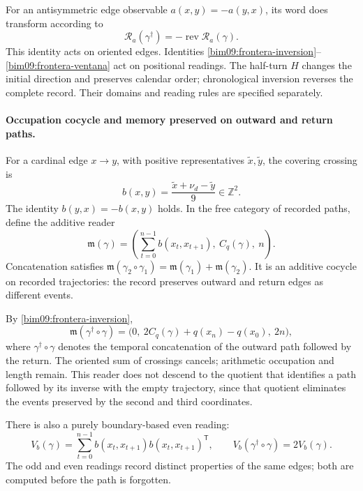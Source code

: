 For an antisymmetric edge observable $a(x,y)=-a(y,x)$, its word
does transform according to
\[
 \mathcal R_a(\gamma^\dagger)
 =-\operatorname{rev}\mathcal R_a(\gamma).
\]
This identity acts on oriented edges. Identities
\eqref{bim09:frontera-inversion}--\eqref{bim09:frontera-ventana}
act on positional readings. The half-turn $H$ changes the
initial direction and preserves calendar order; chronological
inversion reverses the complete record. Their domains and reading rules
are specified separately.

\paragraph{Occupation cocycle and memory preserved on outward and return paths.}

For a cardinal edge $x\to y$, with positive representatives
$\widetilde x,\widetilde y$, the covering crossing is
\[
 b(x,y)=\frac{\widetilde x+\nu_d-\widetilde y}{9}\in\mathbb Z^2.
\]
The identity $b(y,x)=-b(x,y)$ holds. In the free category of recorded
paths, define the additive reader
\begin{equation}
 \mathfrak m(\gamma)=
 \left(\sum_{t=0}^{n-1}b(x_t,x_{t+1}),\ C_q(\gamma),\ n\right).
 \label{bim09:memoria-aditiva}
\end{equation}
Concatenation satisfies
$\mathfrak m(\gamma_2\circ\gamma_1)=
\mathfrak m(\gamma_1)+\mathfrak m(\gamma_2)$.
It is an additive cocycle on recorded trajectories: the record preserves
outward and return edges as different events.

By \eqref{bim09:frontera-inversion},
\begin{equation}
 \mathfrak m(\gamma^\dagger\circ\gamma)=
 \bigl(0,\ 2C_q(\gamma)+q(x_n)-q(x_0),\ 2n\bigr),
 \label{bim09:memoria-retorno}
\end{equation}
where $\gamma^\dagger\circ\gamma$ denotes the temporal concatenation
of the outward path followed by the return. The oriented sum of crossings cancels;
arithmetic occupation and length remain. This reader does not
descend to the quotient that identifies a path followed by its inverse
with the empty trajectory, since that quotient eliminates the events
preserved by the second and third coordinates.

There is also a purely boundary-based even reading:
\[
 V_b(\gamma)=\sum_{t=0}^{n-1}
 b(x_t,x_{t+1})b(x_t,x_{t+1})^{\mathsf T},\qquad
 V_b(\gamma^\dagger\circ\gamma)=2V_b(\gamma).
\]
The odd and even readings record distinct properties of
the same edges; both are computed before the path is forgotten.

